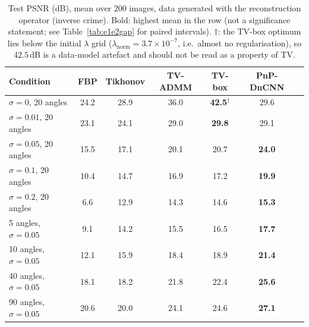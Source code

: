 \begin{table}[htbp]
\centering\small\setlength{\tabcolsep}{5pt}
\caption{Test PSNR (dB), mean over 200 images, data generated with the reconstruction operator (inverse crime). Bold: highest mean in the row (not a significance statement; see Table~\ref{tab:e1e2gap} for paired intervals).
$\dagger$: the TV-box optimum lies below the initial $\lambda$ grid ($\lambda_{\mathrm{norm}}=3.7\times10^{-7}$, i.e.\ almost no regularisation), so $42.5$\,dB
is a data-model artefact and should not be read as a property of TV.}\label{tab:e1e2}
\begin{tabular}{lcccccc}
\toprule
Condition & FBP & Tikhonov & TV-ADMM & TV-box & PnP-DnCNN \\
\midrule
$\sigma{=}0$, 20 angles     & 24.2 & 28.9 & 36.0 & \textbf{42.5}$^\dagger$ & 29.6 \\
$\sigma{=}0.01$, 20 angles  & 23.1 & 24.1 & 29.0 & \textbf{29.8} & 29.1 \\
$\sigma{=}0.05$, 20 angles  & 15.5 & 17.1 & 20.1 & 20.7 & \textbf{24.0} \\
$\sigma{=}0.1$, 20 angles   & 10.4 & 14.7 & 16.9 & 17.2 & \textbf{19.9} \\
$\sigma{=}0.2$, 20 angles   & 6.6  & 12.9 & 14.3 & 14.6 & \textbf{15.3} \\
\midrule
5 angles, $\sigma{=}0.05$   & 9.1  & 14.2 & 15.5 & 16.5 & \textbf{17.7} \\
10 angles, $\sigma{=}0.05$  & 12.1 & 15.9 & 18.4 & 18.9 & \textbf{21.4} \\
40 angles, $\sigma{=}0.05$  & 18.1 & 18.2 & 21.8 & 22.4 & \textbf{25.6} \\
90 angles, $\sigma{=}0.05$  & 20.6 & 20.0 & 24.1 & 24.6 & \textbf{27.1} \\
\bottomrule
\end{tabular}
\end{table}

